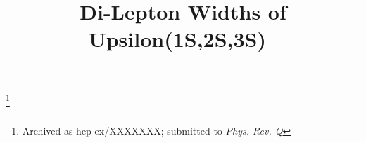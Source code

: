 \documentclass[aps,prd,preprint,superscriptaddress,tightenlines,nofootinbib,floatfix]{revtex4}
\begin{document}
\newcommand{\G}		{\mbox{${G}$}}
\newcommand{\GG}	{\mbox{${\cal G}$}}
\newcommand{\ARG}	{\mbox{${A}$}}
\newcommand{\LIN}	{\mbox{${L}$}}
\newcommand{\BW}	{\mbox{${\cal R}$}}
\newcommand{\FI}	{\mbox{${F_0}$}}
\newcommand{\DG}	{\mbox{${a\G_1+b\G_2}$}}
\newcommand{\GGG}	{\mbox{${a\G+b\GG}$}}
\newcommand{\DGG}	{\mbox{${a\GG_1+b\GG_2}$}}

\newcommand{\sba} 	{\mbox{${S/B}$}}
\newcommand{\rfw}   {\mbox{$R_2$}}
\newcommand{\effmc}     {\mbox{${\epsilon_{\rm MC}}$}}
\newcommand{\effdata}     {\mbox{${\epsilon_{\rm DATA}}$}}

\newcommand{\RR}	{\mbox{${\cal R}$}}

\newcommand{\subs}[1]{{\mbox{\scriptsize #1}}}
\newcommand{\re}{\mathrm{Re\:}}



\title{Di-Lepton Widths of Upsilon(1S,2S,3S)~}

\thanks{Archived as hep-ex/XXXXXXX; 
submitted to {\it Phys. Rev. Q}}

\end{document}
